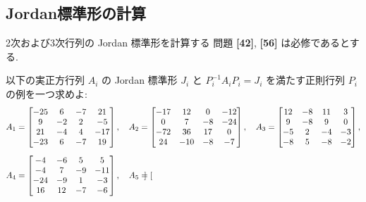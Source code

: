 \documentclass[12pt,twoside]{jarticle}
\begin{document}

\subsection{Jordan標準形の計算}

2次および3次行列の Jordan 標準形を計算する
問題 {\bf[42]}, {\bf[56]} は必修であるとする.

\begin{question}[各 $A_i$ ごとに10点]
\label{q:Jordan-normal-form-example}
  以下の実正方行列 $A_i$ の Jordan 標準形 $J_i$ と $P_i^{-1}A_iP_i=J_i$ 
  を満たす正則行列 $P_i$ の例を一つ求めよ:
  {\small
  \begin{align*}
    &
    A_1 =
    \begin{bmatrix}
      -25 &   6 &  -7 &  21 \\
        9 &  -2 &   2 &  -5 \\
       21 &  -4 &   4 & -17 \\
      -23 &   6 &  -7 &  19 \\
    \end{bmatrix},
    \quad
    A_2 =
    \begin{bmatrix}
      -17 &  12 &   0 & -12 \\
        0 &   7 &  -8 & -24 \\
      -72 &  36 &  17 &   0 \\
       24 & -10 &  -8 &  -7 \\
    \end{bmatrix},
    \quad
    A_3 =
    \begin{bmatrix}
      12 &  -8 &  11 &   3 \\
       9 &  -8 &   9 &   0 \\
      -5 &   2 &  -4 &  -3 \\
      -8 &   5 &  -8 &  -2 \\
    \end{bmatrix},
    \\[\medskipamount] &
    A_4 =
    \begin{bmatrix}
       -4 &  -6 &   5 &   5 \\
       -4 &   7 &  -9 & -11 \\
      -24 &  -9 &   1 &  -3 \\
       16 &  12 &  -7 &  -6 \\
    \end{bmatrix},
    \quad
    A_5 =
    \begin{bmatrix}

\end{bmatrix}
\end{align*}}
\end{question}
\end{document}
